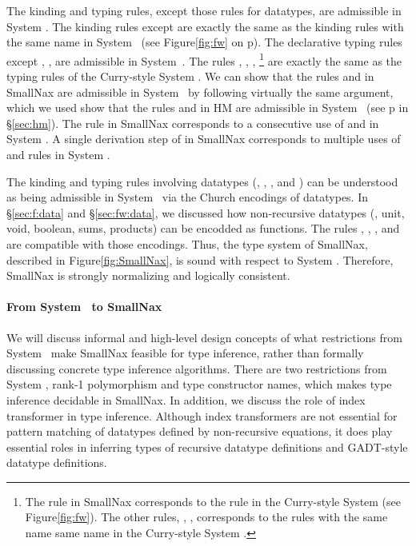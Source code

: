 The kinding and typing rules, except those rules for datatypes, are admissible
in System \Fw. The kinding rules except  are exactly the same as
the kinding rules with the same name in System \Fw\ (see Figure\;\ref{fig:fw}
on p\pageref{fig:fw}). The declarative typing rules except ,
,  are admissible in System~\Fw. The rules
, , , \footnote{
	The  rule in SmallNax corresponds to
	the  rule in the Curry-style System \Fw
	(see Figure\;\ref{fig:fw}). The other rules, ,
	,  corresponds to the rules with
	the same name same name in the Curry-style System \Fw. }
are exactly the same as the typing rules of the Curry-style System \Fw.
We can show that the rules  and  in SmallNax are
admissible in System \Fw\ by following virtually the same argument, which
we used show that the rules  and  in HM are
admissible in System \F\ (see p\pageref{hm:LetAdmissibleFw} in \S\ref{sec:hm}).
The  rule in SmallNax corresponds to a consecutive use of
 and  in System \Fw. A single derivation step of
 in SmallNax corresponds to multiple uses of 
and  rules in System \Fw.

The kinding and typing rules involving datatypes (,
, , and ) can be understood as
being admissible in System \Fw\ via the Church encodings of datatypes.
In \S\ref{sec:f:data} and \S\ref{sec:fw:data}, we discussed
how non-recursive datatypes (\eg, unit, void, boolean, sums, products)
can be encodded as functions. The rules , ,
, and  are compatible with those encodings.
Thus, the type system of SmallNax, described in Figure\;\ref{fig:SmallNax},
is sound with respect to System \Fw.
Therefore, SmallNax is strongly normalizing and logically consistent.

\paragraph{From System \Fw\ to SmallNax}
We will discuss informal and high-level design concepts of what restrictions
from System \Fw\ make SmallNax feasible for type inference, rather than
formally discussing concrete type inference algorithms. There are two
restrictions from System \Fw, rank-1 polymorphism and type constructor names,
which makes type inference decidable in SmallNax. In addition, we discuss
the role of index transformer in type inference. Although index transformers
are not essential for pattern matching of datatypes defined by non-recursive
equations, it does play essential roles in inferring types of recursive
datatype definitions and GADT-style datatype definitions.

